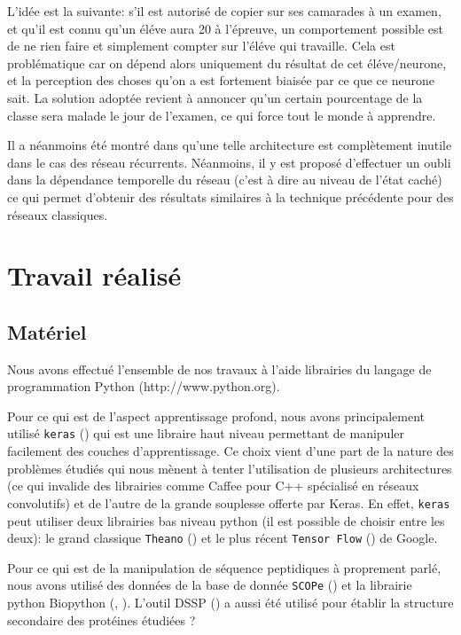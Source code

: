 \documentclass[a4paper, 11pt, onecolumn]{article}
\begin{document}
L'idée est la suivante: s'il est autorisé de copier sur ses camarades à un
examen, et qu'il est connu qu'un éléve aura 20 à l'épreuve, un comportement
possible est de ne rien faire et simplement compter sur l'éléve qui travaille.
Cela est problématique car on dépend alors uniquement du résultat de cet
éléve/neurone, et la perception des choses qu'on a est fortement biaisée par ce
que ce neurone sait. La solution adoptée revient à annoncer qu'un certain
pourcentage de la classe sera malade le jour de l'examen, ce qui force tout le
monde à apprendre.

Il a néanmoins été montré dans \cite{gal2015theoretically} qu'une telle
architecture est complètement inutile dans le cas des réseau récurrents.
Néanmoins, il y est proposé d'effectuer un oubli dans la dépendance temporelle
du réseau (c'est à dire au niveau de l'état caché) ce qui permet d'obtenir des
résultats similaires à la technique précédente pour des réseaux classiques.

\section{Travail réalisé}

\subsection{Matériel}

Nous avons effectué l'ensemble de nos travaux à l'aide librairies du langage de
programmation Python (http://www.python.org).

Pour ce qui est de l'aspect apprentissage profond, nous avons principalement
utilisé \texttt{keras} (\cite{chollet2015keras}) qui est une libraire haut niveau
permettant de manipuler facilement des couches d'apprentissage. Ce choix vient
d'une part de la nature des problèmes étudiés qui nous mènent à tenter
l'utilisation de plusieurs architectures (ce qui invalide des librairies comme
Caffee pour C++ spécialisé en réseaux convolutifs) et de l'autre de la grande
souplesse offerte par Keras. En effet, \texttt{keras} peut utiliser deux
librairies bas niveau python (il est possible de choisir entre les deux): le
grand classique \texttt{Theano} (\cite{2016arXiv160502688full}) et le plus récent
\texttt{Tensor Flow} (\cite{tensorflow2015-whitepaper}) de Google.

Pour ce qui est de la manipulation de séquence peptidiques à proprement parlé,
nous avons utilisé des données de la base de donnée \texttt{SCOPe}
(\cite{fox2014scope}) et la librairie python Biopython (\cite{Cock01062009},
\cite{hamelryck2003pdb}). L'outil DSSP (\cite{kabsch1983dictionary}) a aussi été
utilisé pour établir la structure secondaire des protéines étudiées ?
\end{document}
